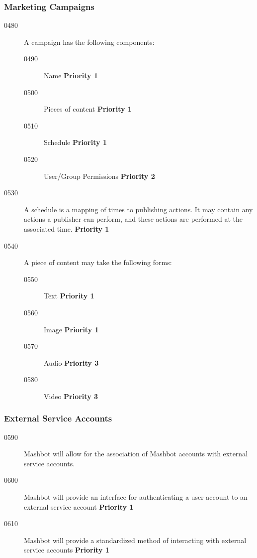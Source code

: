 \documentclass{article}
\begin{document}
\subsubsection{Marketing Campaigns} %
\begin{description}

\item[0480] A campaign has the following components:

\begin{description}
\item[0490] Name \textbf{Priority 1}
\item[0500] Pieces of content \textbf{Priority 1}
\item[0510] Schedule \textbf{Priority 1}
\item[0520] User/Group Permissions \textbf{Priority 2}
\end{description}

\item[0530] A schedule is a mapping of times to publishing actions. It may
  contain any actions a publisher can perform, and these actions are
  performed at the associated time. \textbf{Priority 1}

\item[0540] A piece of content may take the following forms:
\begin{description}
\item[0550] Text \textbf{Priority 1}
\item[0560] Image \textbf{Priority 1}
\item[0570] Audio \textbf{Priority 3}
\item[0580] Video \textbf{Priority 3}
\end{description}
\end{description}

\subsubsection{External Service Accounts} %

\begin{description}
\item[0590] Mashbot will allow for the association of Mashbot accounts with
  external service accounts.

\item[0600] Mashbot will provide an interface for authenticating a user
  account to an external service account \textbf{Priority 1}
\item[0610] Mashbot will provide a standardized method of interacting with
  external service accounts \textbf{Priority 1}
\end{description}
\end{document}

